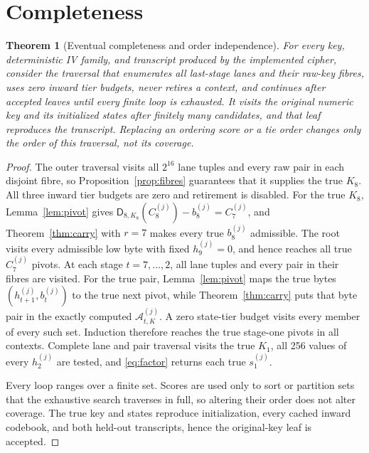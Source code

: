\documentclass[10pt]{article}
\theoremstyle{plain}
\newtheorem{theorem}{Theorem}
\theoremstyle{definition}
\theoremstyle{remark}
\newcommand{\D}{\mathsf D}
\begin{document}
\section{Completeness}
\label{sec:correctness}

\begin{theorem}[Eventual completeness and order independence]
\label{thm:complete}
For every key, deterministic IV family, and transcript produced by the
implemented cipher, consider the traversal that enumerates all last-stage
lanes and their raw-key fibres, uses zero inward tier budgets, never retires a
context, and continues after accepted leaves until every finite loop is
exhausted.  It visits the original numeric key and its initialized states
after finitely many candidates, and that leaf reproduces the transcript.
Replacing an ordering score or a tie order changes only the order of this
traversal, not its coverage.
\end{theorem}
\begin{proof}
The outer traversal visits all \(2^{16}\) lane tuples and every raw pair in
each disjoint fibre, so Proposition~\ref{prop:fibres} guarantees that it
supplies the true \(K_8\).  All three inward tier budgets are zero and
retirement is disabled.  For the true \(K_8\), Lemma~\ref{lem:pivot}
gives \(\D_{8,K_8}(C_8^{(j)})-b_8^{(j)}=C_7^{(j)}\), and
Theorem~\ref{thm:carry} with \(r=7\) makes every true \(b_8^{(j)}\) admissible.
The root visits every admissible low byte with fixed \(h_9^{(j)}=0\), and hence
reaches all true \(C_7^{(j)}\) pivots.  At each stage \(t=7,\ldots,2\), all lane
tuples and every pair in their fibres are visited.  For the true pair,
Lemma~\ref{lem:pivot} maps the true bytes
\((h_{t+1}^{(j)},b_t^{(j)})\) to the true next pivot, while
Theorem~\ref{thm:carry} puts that byte pair in the exactly computed
\(\mathcal A_{t,K}^{(j)}\).  A zero state-tier budget visits every member of
every such set.  Induction therefore reaches the true stage-one pivots in all
contexts.  Complete lane and pair traversal visits the true \(K_1\), all 256
values of every \(h_2^{(j)}\) are tested, and \eqref{eq:factor} returns each
true \(s_1^{(j)}\).

Every loop ranges over a finite set.  Scores are used only to sort or partition
sets that the exhaustive search traverses in full, so altering their order does not
alter coverage.  The true key and states reproduce initialization, every
cached inward codebook, and both held-out transcripts, hence the original-key
leaf is accepted.
\end{proof}
\end{document}
